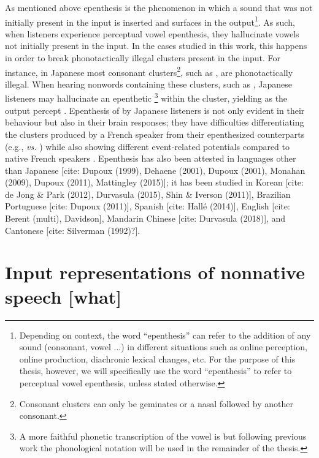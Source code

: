 As mentioned above epenthesis is the phenomenon in which a sound that was not initially present in the input is inserted and surfaces in the output\footnote{Depending on context, the word ``epenthesis'' can refer to the addition of any sound (consonant, vowel ...) in different situations such as online perception, online production, diachronic lexical changes, etc. For the purpose of this thesis, however, we will specifically use the word ``epenthesis'' to refer to perceptual vowel epenthesis, unless stated otherwise.}. As such, when listeners experience perceptual vowel epenthesis, they hallucinate vowels not initially present in the input. In the cases studied in this work, this happens in order to break phonotactically illegal clusters present in the input. For instance, in Japanese most consonant clusters\footnote{Consonant clusters can only be geminates or a nasal followed by another consonant.}, such as , are phonotactically illegal. When hearing nonwords containing these clusters, such as , Japanese listeners may hallucinate an epenthetic \footnote{A more faithful phonetic transcription of the vowel is \textipa{[W]} but following previous work the phonological notation  will be used in the remainder of the thesis.} within the cluster, yielding  as the output percept \cite{dupoux1999}. Epenthesis of  by Japanese listeners is not only evident in their behaviour but also in their brain responses; they have difficulties differentiating the clusters produced by a French speaker from their epenthesized counterparts (e.g.,  \textit{vs.} ) while also showing different event-related potentials compared to native French speakers \cite{dehaene2000}.
Epenthesis has also been attested in languages other than Japanese [cite: Dupoux (1999), Dehaene (2001), Dupoux (2001), Monahan (2009), Dupoux (2011), Mattingley (2015)]; it has been studied in Korean [cite: de Jong \& Park (2012), Durvasula (2015), Shin \& Iverson (2011)], Brazilian Portuguese [cite: Dupoux (2011)], Spanish [cite: Hallé (2014)], English [cite: Berent (multi), Davidson], Mandarin Chinese [cite: Durvasula (2018)], and Cantonese [cite: Silverman (1992)?]. 



\section{Input representations of nonnative speech [what]}


